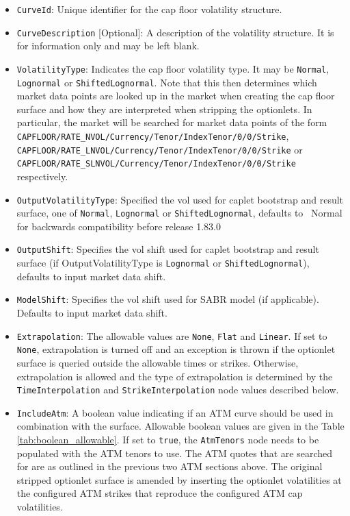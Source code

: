 \begin{itemize}
\item
\lstinline!CurveId!: Unique identifier for the cap floor volatility structure.

\item \lstinline!CurveDescription! [Optional]:
A description of the volatility structure. It is for information only and may be left blank.

\item \lstinline!VolatilityType!:
Indicates the cap floor volatility type. It may be \lstinline!Normal!, \lstinline!Lognormal! or \lstinline!ShiftedLognormal!. Note that this then determines which market data points are looked up in the market when creating the cap floor surface and how they are interpreted when stripping the optionlets. In particular, the market will be searched for market data points of the form \lstinline!CAPFLOOR/RATE_NVOL/Currency/Tenor/IndexTenor/0/0/Strike!, \lstinline!CAPFLOOR/RATE_LNVOL/Currency/Tenor/IndexTenor/0/0/Strike! or \lstinline!CAPFLOOR/RATE_SLNVOL/Currency/Tenor/IndexTenor/0/0/Strike! respectively.

\item \lstinline!OutputVolatilityType!: Specified the vol used for caplet bootstrap and result surface, one of {\tt Normal},
  {\tt Lognormal} or {\tt ShiftedLognormal}, defaults to {\ Normal} for backwards compatibility before release 1.83.0

\item \lstinline!OutputShift!: Specifies the vol shift used for caplet bootstrap and result surface (if OutputVolatilityType is
{\tt Lognormal} or {\tt ShiftedLognormal}), defaults to input market data shift.

\item \lstinline!ModelShift!: Specifies the vol shift used for SABR model (if applicable). Defaults to input market data shift.

\item \lstinline!Extrapolation!:
The allowable values are \lstinline!None!, \lstinline!Flat! and \lstinline!Linear!. If set to \lstinline!None!, extrapolation is turned off and an exception is thrown if the optionlet surface is queried outside the allowable times or strikes. Otherwise, extrapolation is allowed and the type of extrapolation is determined by the \lstinline!TimeInterpolation! and \lstinline!StrikeInterpolation! node values described below.

\item \lstinline!IncludeAtm!:
A boolean value indicating if an ATM curve should be used in combination with the surface. Allowable boolean values are given in the Table \ref{tab:boolean_allowable}. If set to \lstinline!true!, the \lstinline!AtmTenors! node needs to be populated with the ATM tenors to use. The ATM quotes that are searched for are as outlined in the previous two ATM sections above. The original stripped optionlet surface is amended by inserting the optionlet volatilities at the configured ATM strikes that reproduce the configured ATM cap volatilities.


\end{itemize}
